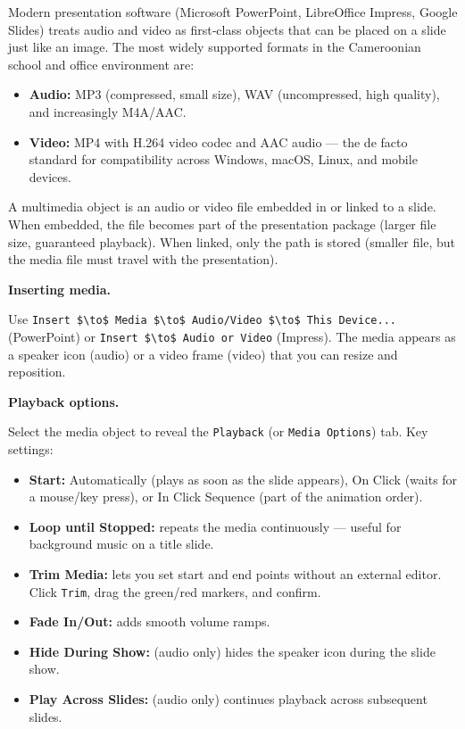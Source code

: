 \documentclass[11pt]{article}
\newcommand{\cle}[1]{{\popxbold\color{popdark}#1}}
\newcounter{popsec}
\newcounter{popsub}
\newcommand{\courssub}[1]{%
  \stepcounter{popsub}%
  \par\vspace{9pt}\noindent{\popxbold\fontsize{11.5}{13}\selectfont\color{popink}{\color{poporange}\thepopsec.\thepopsub}\hspace{6pt}#1}\par\nopagebreak\vspace{4pt}
}
\begin{document}
\courssub{Multimedia in Presentations}

Modern presentation software (Microsoft PowerPoint, LibreOffice Impress, Google Slides) treats audio and video as first‑class objects that can be placed on a slide just like an image. The most widely supported formats in the Cameroonian school and office environment are:

\begin{itemize}
\item \textbf{Audio:} \cle{MP3} (compressed, small size), \cle{WAV} (uncompressed, high quality), and increasingly \cle{M4A}/AAC.
\item \textbf{Video:} \cle{MP4} with H.264 video codec and AAC audio — the de facto standard for compatibility across Windows, macOS, Linux, and mobile devices.
\end{itemize}

\begin{definition}
A multimedia object is an audio or video file embedded in or linked to a slide. When embedded, the file becomes part of the presentation package (larger file size, guaranteed playback). When linked, only the path is stored (smaller file, but the media file must travel with the presentation).
\end{definition}

\textbf{Inserting media.}\par
Use \texttt{Insert \$\textbackslash{}to\$ Media \$\textbackslash{}to\$ Audio/Video \$\textbackslash{}to\$ This Device...} (PowerPoint) or \texttt{Insert \$\textbackslash{}to\$ Audio or Video} (Impress). The media appears as a speaker icon (audio) or a video frame (video) that you can resize and reposition.

\textbf{Playback options.}\par
Select the media object to reveal the \texttt{Playback} (or \texttt{Media Options}) tab. Key settings:
\begin{itemize}
\item \textbf{Start:} \cle{Automatically} (plays as soon as the slide appears), \cle{On Click} (waits for a mouse/key press), or \cle{In Click Sequence} (part of the animation order).
\item \textbf{Loop until Stopped:} repeats the media continuously — useful for background music on a title slide.
\item \textbf{Trim Media:} lets you set start and end points without an external editor. Click \texttt{Trim}, drag the green/red markers, and confirm.
\item \textbf{Fade In/Out:} adds smooth volume ramps.
\item \textbf{Hide During Show:} (audio only) hides the speaker icon during the slide show.
\item \textbf{Play Across Slides:} (audio only) continues playback across subsequent slides.
\end{itemize}
\end{document}
